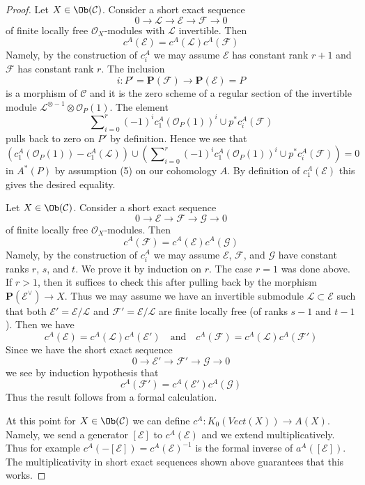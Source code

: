 \begin{proof}
\medskip\noindent
Let $X \in \Ob(\mathcal{C})$. Consider a short exact sequence
$$
0 \to \mathcal{L} \to \mathcal{E} \to \mathcal{F} \to 0
$$
of finite locally free $\mathcal{O}_X$-modules with $\mathcal{L}$ invertible.
Then
$$
c^A(\mathcal{E}) = c^A(\mathcal{L}) c^A(\mathcal{F})
$$
Namely, by the construction of $c^A_i$ we may assume $\mathcal{E}$ has
constant rank $r + 1$ and $\mathcal{F}$ has constant rank $r$.
The inclusion
$$
i : P' = \mathbf{P}(\mathcal{F}) \longrightarrow \mathbf{P}(\mathcal{E}) = P
$$
is a morphism of $\mathcal{C}$ and it is the zero scheme of a regular
section of the invertible module
$\mathcal{L}^{\otimes -1} \otimes \mathcal{O}_P(1)$.
The element
$$
\sum\nolimits_{i = 0}^r (-1)^i c_1^A(\mathcal{O}_P(1))^i \cup
p^*c^A_i(\mathcal{F})
$$
pulls back to zero on $P'$ by definition. Hence we see that
$$
\left(c_1^A(\mathcal{O}_P(1)) - c_1^A(\mathcal{L})\right) \cup
\left(\sum\nolimits_{i = 0}^r (-1)^i c_1^A(\mathcal{O}_P(1))^i \cup
p^*c^A_i(\mathcal{F})\right) = 0
$$
in $A^*(P)$ by assumption (5) on our cohomology $A$.
By definition of $c_1^A(\mathcal{E})$
this gives the desired equality.

\medskip\noindent
Let $X \in \Ob(\mathcal{C})$. Consider a short exact sequence
$$
0 \to \mathcal{E} \to \mathcal{F} \to \mathcal{G} \to 0
$$
of finite locally free $\mathcal{O}_X$-modules. Then
$$
c^A(\mathcal{F}) = c^A(\mathcal{E}) c^A(\mathcal{G})
$$
Namely, by the construction of $c^A_i$ we may assume
$\mathcal{E}$, $\mathcal{F}$, and $\mathcal{G}$ have
constant ranks $r$, $s$, and $t$. We prove it by induction on $r$.
The case $r = 1$ was done above. If $r > 1$, then it suffices to check
this after pulling back by the morphism $\mathbf{P}(\mathcal{E}^\vee) \to X$.
Thus we may assume we have an invertible submodule
$\mathcal{L} \subset \mathcal{E}$ such that both
$\mathcal{E}' = \mathcal{E}/\mathcal{L}$ and
$\mathcal{F}' = \mathcal{E}/\mathcal{L}$ are finite locally free
(of ranks $s - 1$ and $t - 1$). Then we have
$$
c^A(\mathcal{E}) = c^A(\mathcal{L}) c^A(\mathcal{E}')
\quad\text{and}\quad
c^A(\mathcal{F}) = c^A(\mathcal{L}) c^A(\mathcal{F}')
$$
Since we have the short exact sequence
$$
0 \to \mathcal{E}' \to \mathcal{F}' \to \mathcal{G} \to 0
$$
we see by induction hypothesis that
$$
c^A(\mathcal{F}') = c^A(\mathcal{E}') c^A(\mathcal{G})
$$
Thus the result follows from a formal calculation.

\medskip\noindent
At this point for $X \in \Ob(\mathcal{C})$
we can define $c^A : K_0(\textit{Vect}(X)) \to A(X)$.
Namely, we send a generator $[\mathcal{E}]$ to $c^A(\mathcal{E})$
and we extend multiplicatively. Thus for example
$c^A(-[\mathcal{E}]) = c^A(\mathcal{E})^{-1}$ is the formal
inverse of $a^A([\mathcal{E}])$.
The multiplicativity in short exact sequences shown above
guarantees that this works.


\end{proof}
